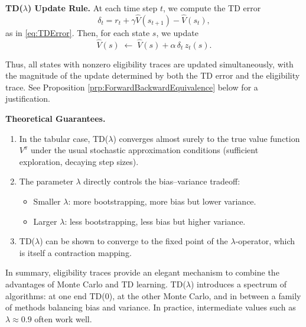\documentclass[
]{book}
\theoremstyle{definition}
\theoremstyle{definition}
\theoremstyle{definition}
\theoremstyle{definition}
\theoremstyle{remark}
\begin{document}
\textbf{TD(\(\lambda\)) Update Rule.} At each time step \(t\), we compute the TD error
\[
\delta_t = r_t + \gamma \hat{V}(s_{t+1}) - \hat{V}(s_t),
\]
as in \eqref{eq:TDError}. Then, for each state \(s\), we update
\begin{equation}
\hat{V}(s) \;\leftarrow\; \hat{V}(s) + \alpha \, \delta_t \, z_t(s).
\label{eq:TDLambdaUpdate}
\end{equation}

Thus, all states with nonzero eligibility traces are updated simultaneously, with the magnitude of the update determined by both the TD error and the eligibility trace. See Proposition \ref{prp:ForwardBackwardEquivalence} below for a justification.

\textbf{Theoretical Guarantees.}

\begin{enumerate}
\def\labelenumi{\arabic{enumi}.}
\item
  In the tabular case, TD(\(\lambda\)) converges almost surely to the true value function \(V^\pi\) under the usual stochastic approximation conditions (sufficient exploration, decaying step sizes).
\item
  The parameter \(\lambda\) directly controls the bias--variance tradeoff:

  \begin{itemize}
  \item
    Smaller \(\lambda\): more bootstrapping, more bias but lower variance.
  \item
    Larger \(\lambda\): less bootstrapping, less bias but higher variance.
  \end{itemize}
\item
  TD(\(\lambda\)) can be shown to converge to the fixed point of the \(\lambda\)-operator, which is itself a contraction mapping.
\end{enumerate}

In summary, eligibility traces provide an elegant mechanism to combine the advantages of Monte Carlo and TD learning. TD(\(\lambda\)) introduces a spectrum of algorithms: at one end TD(0), at the other Monte Carlo, and in between a family of methods balancing bias and variance. In practice, intermediate values such as \(\lambda \approx 0.9\) often work well.
\end{document}
